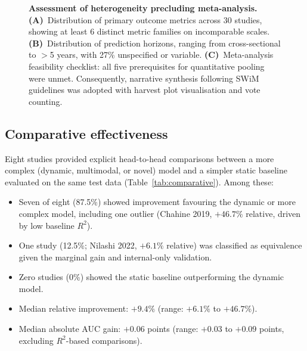 \documentclass[11pt,a4paper]{article}
\begin{document}
\begin{figure}[H]
\caption{\textbf{Assessment of heterogeneity precluding meta-analysis.} \textbf{(A)}~Distribution of primary outcome metrics across 30 studies, showing at least 6 distinct metric families on incomparable scales. \textbf{(B)}~Distribution of prediction horizons, ranging from cross-sectional to $>$5 years, with 27\% unspecified or variable. \textbf{(C)}~Meta-analysis feasibility checklist: all five prerequisites for quantitative pooling were unmet. Consequently, narrative synthesis following SWiM guidelines was adopted with harvest plot visualisation and vote counting.}
\label{fig:heterogeneity}
\end{figure}

\subsection{Comparative effectiveness}

Eight studies provided explicit head-to-head comparisons between a more complex (dynamic, multimodal, or novel) model and a simpler static baseline evaluated on the same test data (Table~\ref{tab:comparative}). Among these:
\begin{itemize}[leftmargin=*]
    \item Seven of eight (87.5\%) showed improvement favouring the dynamic or more complex model, including one outlier (Chahine 2019, $+46.7\%$ relative, driven by low baseline $R^2$).
    \item One study (12.5\%; Nilashi 2022, $+6.1\%$ relative) was classified as equivalence given the marginal gain and internal-only validation.
    \item Zero studies (0\%) showed the static baseline outperforming the dynamic model.
    \item Median relative improvement: $+9.4\%$ (range: $+6.1\%$ to $+46.7\%$).
    \item Median absolute AUC gain: $+0.06$ points (range: $+0.03$ to $+0.09$ points, excluding $R^2$-based comparisons).
\end{itemize}
\end{document}
